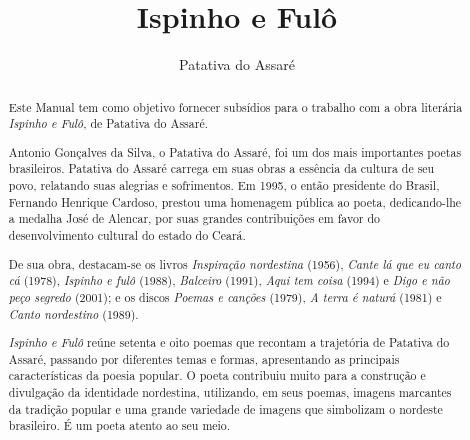 \documentclass[12pt]{extarticle}
\begin{document}
\newcommand{\AutorLivro}{Patativa do Assaré}
\newcommand{\TituloLivro}{Ispinho e Fulô}
\newcommand{\Tema}{Ficção, mistério e fantasia}
\newcommand{\Genero}{Poema}
\newcommand{\imagemCapa}{./images/PNLD0033-01.png}
\newcommand{\issnppub}{---}
\newcommand{\issnepub}{---}
\newcommand{\colaborador}{\textbf{Fulano de Tal} é uma pessoa incrível e vai fazer um bom serviço.}


\title{\TituloLivro}
\author{\AutorLivro}
\def\authornotes{\colaborador}

\date{}
\maketitle


\begin{abstract}
Este Manual tem como objetivo fornecer subsídios para o trabalho com a
obra literária \emph{Ispinho e Fulô}, de Patativa do Assaré.

Antonio Gonçalves da Silva, o Patativa do Assaré, foi um dos mais importantes
poetas brasileiros.  Patativa do Assaré carrega em suas obras a essência da 
cultura de seu povo, relatando suas alegrias e sofrimentos. Em 1995, o então 
presidente do Brasil, Fernando Henrique Cardoso, prestou uma homenagem pública 
ao poeta, dedicando-lhe a medalha José de Alencar, por suas grandes contribuições 
em favor do desenvolvimento cultural do estado do Ceará.

De sua obra, destacam-se os livros \textit{Inspiração nordestina} (1956), 
\textit{Cante lá que eu canto cá} (1978), \textit{Ispinho e fulô} (1988), 
\textit{Balceiro} (1991), \textit{Aqui tem coisa} (1994) e \textit{Digo e 
não peço segredo} (2001); e os discos \textit{Poemas e canções} (1979), 
\textit{A terra é naturá} (1981) e \textit{Canto nordestino} (1989).

\emph{Ispinho e Fulô} reúne setenta e oito poemas que recontam a trajetória 
de Patativa do Assaré, passando por diferentes temas e formas, apresentando as 
principais características da poesia popular. O poeta contribuiu muito para a 
construção e divulgação da identidade nordestina, utilizando, em seus poemas, 
imagens marcantes da tradição popular e uma grande variedade de imagens que 
simbolizam o nordeste brasileiro. É um poeta atento ao seu meio.


\end{abstract}
\end{document}
